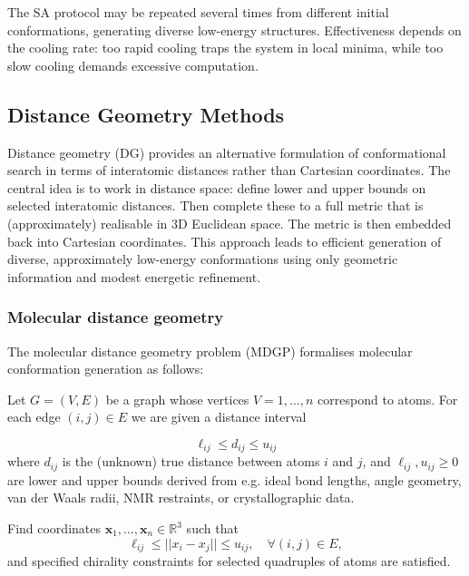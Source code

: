 \documentclass[12pt]{article}
\begin{document}
The SA protocol may be repeated several times from different initial conformations, generating diverse low-energy structures. Effectiveness depends on the cooling rate: too rapid cooling traps the system in local minima, while too slow cooling demands excessive computation.

\subsection{Distance Geometry Methods}

Distance geometry (DG)\cite{CH2_crippen_havel_book,CH2_havel_kuntz_crippen_1983,CH2_crippen_chem_dg_1991} provides an alternative formulation of conformational search in terms of interatomic distances rather than Cartesian coordinates. The central idea is to work in distance space: define lower and upper bounds on selected interatomic distances. Then complete these to a full metric that is (approximately) realisable in 3D Euclidean space. The metric is then embedded back into Cartesian coordinates. This approach leads to efficient generation of diverse, approximately low-energy conformations using only geometric information and modest energetic refinement.\cite{CH2_spellmeyer_dg_conf_1997,CH2_riniker_landrum_2015}

\subsubsection{Molecular distance geometry}
The molecular distance geometry problem (MDGP)\cite{CH2_crippen_chem_dg_1991,CH2_havel_dg_review_1998} formalises molecular conformation generation as follows:

Let $G = (V,E)$ be a graph whose vertices $V = {1,\dots,n}$ correspond to atoms. For each edge $(i,j) \in E$ we are given a distance interval

\begin{equation}
    \ell_{ij} \leq d_{ij} \leq u_{ij}
      \label{eq:Mol_DG}
\end{equation}
where $d_{ij}$ is the (unknown) true distance between atoms $i$ and $j$, and $\ell_{ij}, u_{ij} \ge 0$ are lower and upper bounds derived from e.g. ideal bond lengths, angle geometry, van der Waals radii, NMR restraints, or crystallographic data.

Find coordinates $\bm{x}_1,\dots,\bm{x}_n \in \mathbb{R}^3$ such that
\begin{equation}
   \ell_{ij} \le ||x_i - x_j|| \le u_{ij}, \quad \forall (i,j) \in E,
\label{eq:mdgp}
\end{equation}
and specified chirality constraints for selected quadruples of atoms are satisfied.
\end{document}
